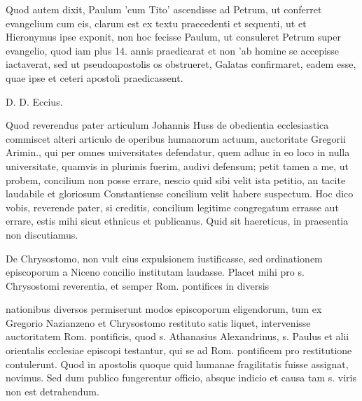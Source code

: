 Quod autem dixit, Paulum 'cum Tito' ascendisse ad Petrum, ut conferret evangelium cum eis, clarum est ex textu praecedenti et sequenti, ut et Hieronymus ipse exponit, non hoc fecisse Paulum, ut consuleret Petrum super evangelio, quod iam plus 14. annis praedicarat et non 'ab homine se accepisse iactaverat, sed ut pseudoapostolis os obstrueret, Galatas confirmaret, eadem esse, quae ipse et ceteri apostoli praedicassent.

D. D. Eccius.

Quod reverendus pater articulum Johannis Huss de obedientia ecclesiastica commiscet alteri articulo de operibus humanorum actuum, auctoritate Gregorii Arimin., qui per omnes universitates defendatur, quem adhuc in eo loco in nulla universitate, quamvis in plurimis fuerim, audivi defensum; petit tamen a me, ut probem, concilium non posse errare, nescio quid sibi velit ista petitio, an tacite laudabile et gloriosum Constantiense concilium velit habere suspectum. Hoc dico vobis, reverende pater, si creditis, concilium legitime congregatum errasse aut errare, estis mihi sicut ethnicus et publicanus. Quid sit haereticus, in praesentia non discutiamus.

De Chrysostomo, non vult eius expulsionem iustificasse, sed ordinationem episcoporum a Niceno concilio institutam laudasse. Placet mihi pro s. Chrysostomi reverentia, et semper Rom. pontifices in diversis

nationibus diversos permiserunt modos episcoporum eligendorum, tum ex Gregorio Nazianzeno et Chrysostomo restituto satis liquet, intervenisse auctoritatem Rom. pontificis, quod s. Athanasius Alexandrinus, s. Paulus et alii orientalis ecclesiae episcopi testantur, qui se ad Rom. pontificem pro restitutione contulerunt. Quod in apostolis quoque quid humanae fragilitatis fuisse assignat, novimus. Sed dum publico fungerentur officio, absque indicio et causa tam s. viris non est detrahendum.

